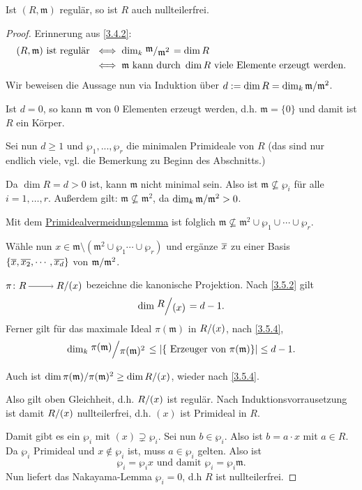 \documentclass[a4paper,12pt,index=toc]{scrbook}
\theoremstyle{keinenummern} %
\def\m{\mathfrak{m}}
\renewcommand{\dotsc}{\ensuremath{\!...}}
\def\Bar#1{\ensuremath\overline{#1}}
\begin{document}
\begin{prop}\label{3.5.5}
Ist $(R,\m)$ regulär, so ist $R$ auch nullteilerfrei.
\end{prop}
\begin{proof} Erinnerung aus \cref{3.4.2}: 
\begin{align*}
(R,\m) \text{ ist regulär }& \iff \dim_k \Quotient{\m}{\m^2}=\dim R\\
&\iff \m\text{ kann durch } \dim R\text{ viele Elemente erzeugt werden.}
\end{align*}
Wir beweisen die Aussage nun via Induktion über $d:=\dim R=\dim_{k}\Quotient{\m}{\m^2}$.

Ist $d=0$, so kann $\m$ von $0$ Elementen erzeugt werden, d.h. $\m=\{0\}$ und damit ist $R$ ein Körper.

Sei nun $d\ge 1$ und $\wp_1,\dotsc,\wp_r$ die minimalen Primideale von $R$ (das sind nur endlich viele, vgl. die Bemerkung zu Beginn des Abschnitts.)

Da $\dim R=d>0$ ist, kann $\m$ nicht minimal sein. Also ist $\m \nsubseteq \wp_i$ für alle $i=1,\dots,r$. Außerdem gilt: $\m \nsubseteq \m^2$, da $\dim_{k} \Quotient{\m}{\m^2}>0$.

Mit dem \hyperref[pivl]{Primidealvermeidungslemma} ist folglich $\m\nsubseteq \m^2\cup \wp_1\cup\dotsm \cup \wp_r$.

Wähle nun $x\in \m\setminus (\m^2\cup \wp_1\dotsm\cup \wp_r)$ und ergänze $\Bar{x}$ zu einer Basis $\{\Bar{x},\Bar{x_2},\dotsm,\Bar{x_d}\}$ von $\Quotient{\m}{\m^2}$.

$\pi\colon R\ra \Quotient{R}{(x)}$ bezeichne die kanonische Projektion. Nach \cref{3.5.2} gilt \[\dim \Quotient{R}{(x)}=d-1.\] Ferner gilt für das maximale Ideal $\pi(\m)$ in $\Quotient{R}{(x)}$, nach \cref{3.5.4},
 \[\dim_{k} \Quotient{\pi(\m) }{\pi(\m)^2} \le |\{\text{ Erzeuger von }\pi(\m)\}|\le d-1.\]

Auch ist $\dim \Quotient{\pi(\m)}{\pi(\m)^2} \ge \dim\Quotient{R}{(x)}$, wieder nach \cref{3.5.4}.

Also gilt oben Gleichheit, d.h. $\Quotient{R}{(x)}$ ist regulär. Nach Induktionsvorrausetzung ist damit $\Quotient{R}{(x)}$ nullteilerfrei, d.h. $(x)$ ist Primideal in $R$.

Damit gibt es ein $\wp_i$ mit $(x)\supsetneq \wp_i$. Sei nun $b\in \wp_i$. Also ist $b=a\cdot x$ mit $a\in R$. Da $\wp_i$ Primideal und $x\notin \wp_i$ ist, muss $a\in \wp_i$ gelten. Also ist \[\wp_i=\wp_i x\text{ und damit }\wp_i=\wp_i \m.\]
Nun liefert das Nakayama-Lemma $\wp_i=0$, d.h $R$ ist nullteilerfrei.
\end{proof}
\end{document}
